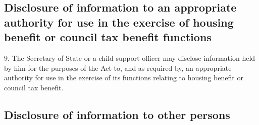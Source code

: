 \documentclass[a4paper,12pt]{article}
\begin{document}

\subsection[9. Disclosure of information to an appropriate authority for use in the exercise of housing benefit or council tax benefit functions]{Disclosure of information to an appropriate authority for use in the exercise of housing benefit or council tax benefit functions}

9.  The Secretary of State or a child support officer may disclose information held by him for the purposes of the Act to, and as required by, an appropriate authority for use in the exercise of its functions relating to housing benefit or council tax benefit.

\subsection[9A. Disclosure of information to other persons]{Disclosure of information to other persons}
\end{document}
